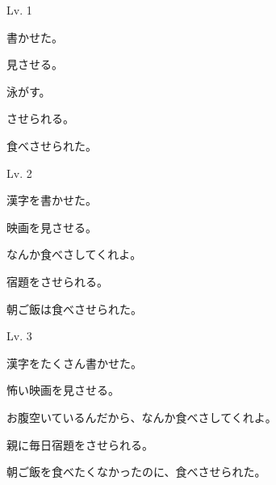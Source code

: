 	\newpage		
		
	\begin{mondai}{Lv. 1}
		\item 書かせた。
		\item 見させる。
		\item 泳がす。
		\item させられる。
		\item 食べさせられた。
	\end{mondai}
		
	\begin{mondai}{Lv. 2}
		\item 漢字を書かせた。
		\item 映画を見させる。
		\item なんか食べさしてくれよ。\footnotemark[1]
		\item 宿題をさせられる。
		\item 朝ご飯は食べさせられた。
	\end{mondai}
	
	\begin{mondai}{Lv. 3}
		\item 漢字をたくさん書かせた。
		\item 怖い映画を見させる。
		\item お腹空いているんだから、なんか食べさしてくれよ。
		\item 親に毎日宿題をさせられる。
		\item 朝ご飯を食べたくなかったのに、食べさせられた。
	\end{mondai}

	

